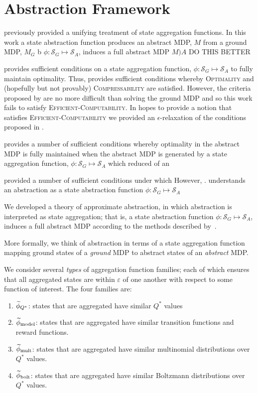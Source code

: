 \section{Abstraction Framework}
\cite{li2006towards} previously provided a unifying treatment of state aggregation functions. In this work a state abstraction function produces an abstract \ac{MDP}, $M$ from a ground \ac{MDP}, $M_G$ b $\phi : \mathcal{S}_G \mapsto \mathcal{S}_A$, induces a full abstract \ac{MDP} $M)A$ DO THIS BETTER


 \cite{li2006towards} provides sufficient conditions on a state aggregation function, $\phi : \mathcal{S}_G \mapsto \mathcal{S}_A$ to fully maintain optimality. Thus, \cite{li2006towards} provides sufficient conditions whereby \textsc{Optimality} and (hopefully but not provably) \textsc{Compressability} are satisfied. However, the criteria proposed by \cite{li2006towards} are no more difficult than solving the ground \ac{MDP} and so this work fails to satisfy \textsc{Efficient-Computability}. In hopes to provide a notion that satisfies \textsc{Efficient-Computability} we provided an $\epsilon$-relaxation of the conditions proposed in \cite{li2006towards}.




 provides a number of sufficient conditions whereby optimality in the abstract \ac{MDP} is fully maintained when the abstract \ac{MDP} is generated by a state aggregation function, $\phi : \mathcal{S}_G \mapsto \mathcal{S}_A$ which reduced of an 

provided a number of sufficient conditions under which However, . understands an abstraction as a state abstraction function $\phi : \mathcal{S}_G \mapsto \mathcal{S}_A$


We developed a theory of approximate abstraction, in which abstraction is interpreted as state aggregation; that is, a state abstraction function $\phi : \mathcal{S}_G \mapsto \mathcal{S}_A$, induces a full abstract \ac{MDP} according to the methods described by~\cite{li2006towards}.

More formally, we think of abstraction in terms of a state aggregation function mapping ground states of a {\it ground} MDP to abstract states of an {\it abstract} MDP.

We consider several {\it types} of aggregation function families; each of which ensures that all aggregated states are within $\varepsilon$ of one another with respect to some function of interest. The four families are:
\begin{enumerate}
\item $\widetilde \phi_{Q^*}$: states that are aggregated have similar $Q^*$ values
\item $\widetilde \phi_{\text{model}}$: states that are aggregated have similar transition functions and reward functions.
\item $\widetilde \phi_{\text{mult}}$: states that are aggregated have similar multinomial distributions over $Q^*$ values.
\item $\widetilde \phi_{\text{bolt}}$: states that are aggregated have similar Boltzmann distributions over $Q^*$ values.
\end{enumerate}

